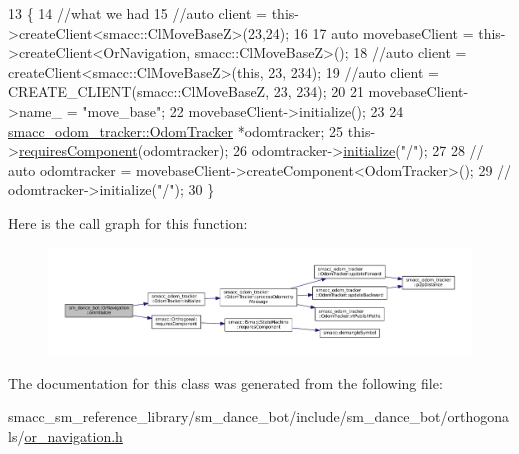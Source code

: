 \begin{DoxyCode}
13     \{
14         \textcolor{comment}{//what we had}
15         \textcolor{comment}{//auto client = this->createClient<smacc::ClMoveBaseZ>(23,24);}
16 
17         \textcolor{keyword}{auto} movebaseClient = this->createClient<OrNavigation, smacc::ClMoveBaseZ>();
18         \textcolor{comment}{//auto client = createClient<smacc::ClMoveBaseZ>(this, 23, 234);}
19         \textcolor{comment}{//auto client = CREATE\_CLIENT(smacc::ClMoveBaseZ, 23, 234);}
20 
21         movebaseClient->name\_ = \textcolor{stringliteral}{"move\_base"};
22         movebaseClient->initialize();
23 
24         \hyperlink{classsmacc__odom__tracker_1_1OdomTracker}{smacc\_odom\_tracker::OdomTracker} *odomtracker;
25         this->\hyperlink{classsmacc_1_1Orthogonal_a098b5be0f89d0911afc44c10b756ef2a}{requiresComponent}(odomtracker);
26         odomtracker->\hyperlink{classsmacc__odom__tracker_1_1OdomTracker_a4b3ff3f659474cb7bdd6b4b54dcc0a53}{initialize}(\textcolor{stringliteral}{"/"});
27 
28         \textcolor{comment}{// auto odomtracker = movebaseClient->createComponent<OdomTracker>();}
29         \textcolor{comment}{// odomtracker->initialize("/");}
30     \}
\end{DoxyCode}


Here is the call graph for this function\+:
\nopagebreak
\begin{figure}[H]
\begin{center}
\leavevmode
\includegraphics[width=350pt]{classsm__dance__bot_1_1OrNavigation_a9f87c78f5af67024c9eda25097a135ac_cgraph}
\end{center}
\end{figure}




The documentation for this class was generated from the following file\+:\begin{DoxyCompactItemize}
\item 
smacc\+\_\+sm\+\_\+reference\+\_\+library/sm\+\_\+dance\+\_\+bot/include/sm\+\_\+dance\+\_\+bot/orthogonals/\hyperlink{smacc__sm__reference__library_2sm__dance__bot_2include_2sm__dance__bot_2orthogonals_2or__navigation_8h}{or\+\_\+navigation.\+h}\end{DoxyCompactItemize}
